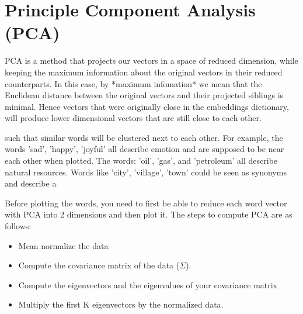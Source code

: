 \documentclass[4apaper,12pt]{book}
\begin{document}
\section {Principle Component Analysis (PCA)}
\begin{description}
\item PCA is a method that projects our vectors in a space of reduced dimension, while keeping the maximum information about the original vectors in their reduced counterparts. In this case, by *maximum infomation* we mean that the Euclidean distance between the original vectors and their projected siblings is minimal. Hence vectors that were originally close in the embeddings dictionary, will produce lower dimensional vectors that are still close to each other.

\item such that similar words will be clustered next to each other. For example, the words 'sad', 'happy', 'joyful' all describe emotion and are supposed to be near each other when plotted. The words: 'oil', 'gas', and 'petroleum' all describe natural resources. Words like 'city', 'village', 'town' could be seen as synonyms and describe a

\item Before plotting the words, you need to first be able to reduce each word vector with PCA into 2 dimensions and then plot it. The steps to compute PCA are as follows:
  \begin{itemize}
  \item Mean normalize the data
  \item Compute the covariance matrix of the data ($\Sigma$).
  \item Compute the eigenvectors and the eigenvalues of your covariance matrix
  \item Multiply the first K eigenvectors by the normalized data.
\end{itemize}
\end{description}
\end{document}
